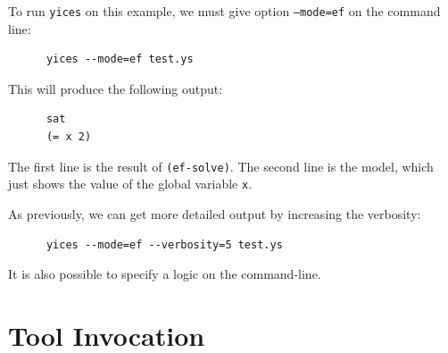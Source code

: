 \documentclass[11pt,twoside,fleqn,openright,titlepage]{cslreport}
\begin{document}
\medskip\noindent
To run \texttt{yices} on this example, we must give option
\texttt{--mode=ef} on the command line:
\begin{small}
\begin{verbatim}
      yices --mode=ef test.ys
\end{verbatim}
\end{small}
This will produce the following output:
\begin{small}
\begin{verbatim}
      sat
      (= x 2)
\end{verbatim}
\end{small}
The first line is the result of \texttt{(ef-solve)}. The second line
is the model, which just shows the value of the global variable
\texttt{x}. 

\medskip\noindent
As previously, we can get more detailed output by increasing the verbosity:
\begin{small}
\begin{verbatim}
      yices --mode=ef --verbosity=5 test.ys
\end{verbatim}
\end{small}
It is also possible to specify a logic on the command-line.



\section{Tool Invocation}
\end{document}

